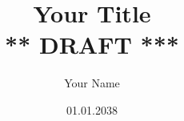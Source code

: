 \documentclass[a4paper,norsk,12pt]{report}
\begin{document}
  \author{Your Name}
  \date{01.01.2038}
  \title{Your Title \\
    {\Huge{\sffamily *** DRAFT ***}}}

  

  \begin{abstract}
    
  \end{abstract}

  \tableofcontents

  \clearpage %

  
  \clearpage

  \begingroup %
  \raggedright %
  \nocite{*} %
  
  \endgroup %

  \appendix
  

  \clearpage %
  \printindex
\end{document}
